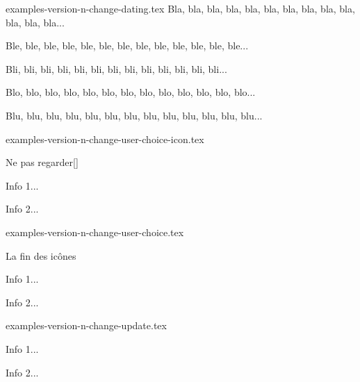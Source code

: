 

\begin{filecontents*}[overwrite]{examples-version-n-change-dating.tex}
Bla, bla, bla, bla, bla, bla, bla, bla, bla, bla, bla, bla, bla...

\medskip %


Ble, ble, ble, ble, ble, ble, ble, ble, ble, ble, ble, ble, ble...

\medskip %


Bli, bli, bli, bli, bli, bli, bli, bli, bli, bli, bli, bli, bli...

Blo, blo, blo, blo, blo, blo, blo, blo, blo, blo, blo, blo, blo...

Blu, blu, blu, blu, blu, blu, blu, blu, blu, blu, blu, blu, blu...
\end{filecontents*}


\begin{filecontents*}[overwrite]{examples-version-n-change-user-choice-icon.tex}
\begin{tdoctopic}{Ne pas regarder}[\faEyeSlash]
    \item Info 1...
    \item Info 2...
\end{tdoctopic}
\end{filecontents*}


\begin{filecontents*}[overwrite]{examples-version-n-change-user-choice.tex}
\begin{tdoctopic}{La fin des icônes}
    \item Info 1...
    \item Info 2...
\end{tdoctopic}
\end{filecontents*}


\begin{filecontents*}[overwrite]{examples-version-n-change-update.tex}
\begin{tdocupdate}
    \item Info 1...
    \item Info 2...
\end{tdocupdate}
\end{filecontents*}


